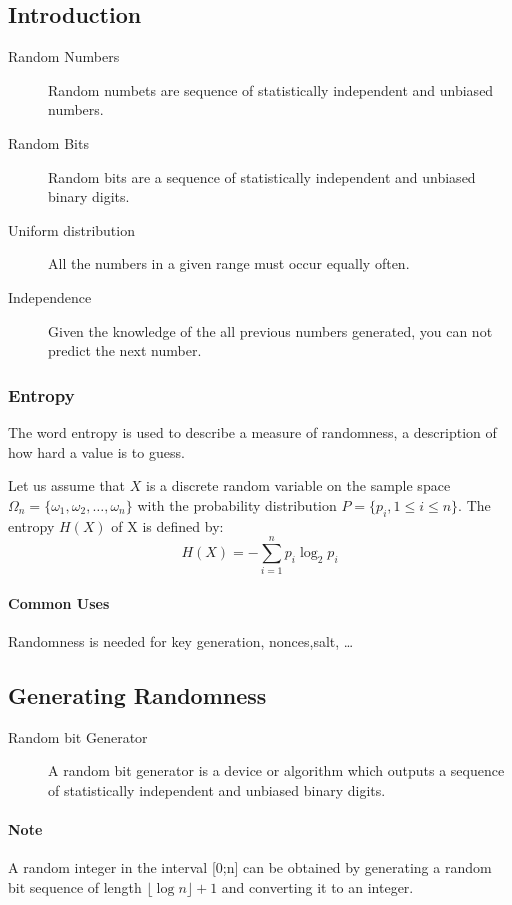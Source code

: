 \subsection{Introduction}
\begin{description}
    \item[Random Numbers] Random numbets are sequence of statistically
    independent and unbiased numbers.
    \item[Random Bits] Random bits are a sequence of statistically independent
    and unbiased binary digits.
    \item[Uniform distribution] All the numbers in a given range must occur
    equally often.
    \item[Independence] Given the knowledge of the all previous numbers
    generated, you can not predict the next number.
\end{description}

\subsubsection{Entropy}
The word entropy is used to describe a measure of randomness, a description
of how hard a value is to guess.
\begin{description}
    \item Let us assume that $X$ is a discrete random variable on the sample
    space $ \Omega_n = \{\omega_1,\omega_2,\ldots,\omega_n\} $ with the
    probability distribution $P=\{ p_i,1 \leq i \leq n \}$. The entropy $H(X)$
    of X is defined by:
    $$ H(X)= - \sum_{i=1}^{n} p_i \log_{2}p_i $$
\end{description}

\paragraph{Common Uses} Randomness is needed for key generation, nonces,salt,
\ldots

\subsection{Generating Randomness}
\begin{description}
    \item[Random bit Generator] A random bit generator is a device or algorithm
    which outputs a sequence of statistically independent and unbiased binary
    digits.
\end{description}

\paragraph{Note} A random integer in the interval [0;n] can be obtained by
generating a random bit sequence of length $ \lfloor \log{}{n} \rfloor + 1 $
and converting it to an integer.

